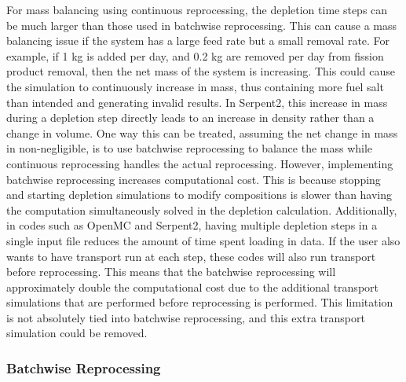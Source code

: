 For mass balancing using continuous reprocessing, the depletion time steps can be much larger than those used in batchwise reprocessing.
This can cause a mass balancing issue if the system has a large feed rate but a small removal rate. For example, if 1 kg is added per day, and 0.2 kg are removed per day from fission product removal, then the net mass of the system is increasing.
This could cause the simulation to continuously increase in mass, thus containing more fuel salt than intended and generating invalid results. In Serpent2, this increase in mass during a depletion step directly leads to an increase in density rather than a change in volume.
One way this can be treated, assuming the net change in mass in non-negligible, is to use batchwise reprocessing to balance the mass while continuous reprocessing handles the actual reprocessing.
However, implementing batchwise reprocessing increases computational cost. This is because stopping and starting depletion simulations to modify compositions is slower than having the computation simultaneously solved in the depletion calculation. Additionally, in codes such as OpenMC and Serpent2, having multiple depletion steps in a single input file reduces the amount of time spent loading in data. If the user also wants to have transport run at each step, these codes will also run transport before reprocessing. This means that the batchwise reprocessing will approximately double the computational cost due to the additional transport simulations that are performed before reprocessing is performed. This limitation is not absolutely tied into batchwise reprocessing, and this extra transport simulation could be removed.

\subsubsection{Batchwise Reprocessing}



